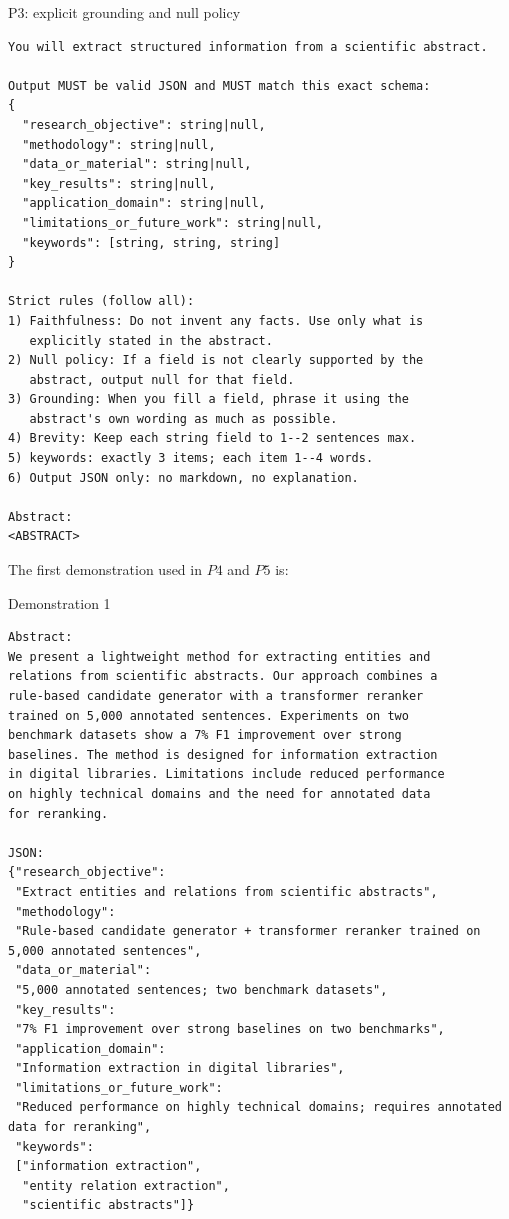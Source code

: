 \documentclass[fleqn,10pt]{wlscirep-authoryear}
\begin{document}
\begin{promptbox}{P3: explicit grounding and null policy}
\begin{lstlisting}[style=promptstyle]
You will extract structured information from a scientific abstract.

Output MUST be valid JSON and MUST match this exact schema:
{
  "research_objective": string|null,
  "methodology": string|null,
  "data_or_material": string|null,
  "key_results": string|null,
  "application_domain": string|null,
  "limitations_or_future_work": string|null,
  "keywords": [string, string, string]
}

Strict rules (follow all):
1) Faithfulness: Do not invent any facts. Use only what is
   explicitly stated in the abstract.
2) Null policy: If a field is not clearly supported by the
   abstract, output null for that field.
3) Grounding: When you fill a field, phrase it using the
   abstract's own wording as much as possible.
4) Brevity: Keep each string field to 1--2 sentences max.
5) keywords: exactly 3 items; each item 1--4 words.
6) Output JSON only: no markdown, no explanation.

Abstract:
<ABSTRACT>
\end{lstlisting}
\end{promptbox}

The first demonstration used in $P4$ and $P5$ is:

\begin{promptbox}{Demonstration 1}
\begin{lstlisting}[style=promptstyle]
Abstract:
We present a lightweight method for extracting entities and
relations from scientific abstracts. Our approach combines a
rule-based candidate generator with a transformer reranker
trained on 5,000 annotated sentences. Experiments on two
benchmark datasets show a 7% F1 improvement over strong
baselines. The method is designed for information extraction
in digital libraries. Limitations include reduced performance
on highly technical domains and the need for annotated data
for reranking.

JSON:
{"research_objective":
 "Extract entities and relations from scientific abstracts",
 "methodology":
 "Rule-based candidate generator + transformer reranker trained on 5,000 annotated sentences",
 "data_or_material":
 "5,000 annotated sentences; two benchmark datasets",
 "key_results":
 "7% F1 improvement over strong baselines on two benchmarks",
 "application_domain":
 "Information extraction in digital libraries",
 "limitations_or_future_work":
 "Reduced performance on highly technical domains; requires annotated data for reranking",
 "keywords":
 ["information extraction",
  "entity relation extraction",
  "scientific abstracts"]}
\end{lstlisting}
\end{promptbox}
\end{document}
